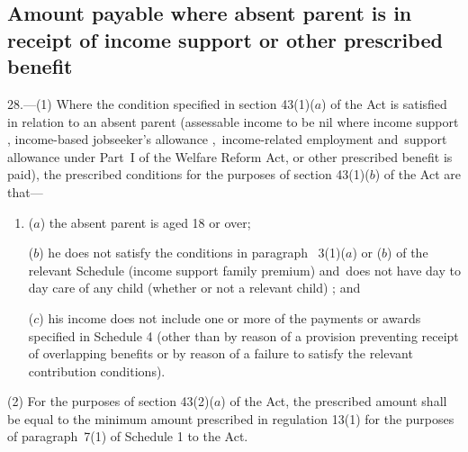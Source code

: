 \documentclass[12pt,a4paper]{article}
\begin{document}

\subsection[28. Amount payable where absent parent is in receipt of income support or other prescribed benefit]{Amount payable where absent parent is in receipt of income support or other prescribed benefit}

28.—(1) Where the condition specified in section 43(1)($a$) of the Act is satisfied in relation to an absent parent (assessable income to be nil where income support%
, income-based jobseeker’s allowance%
,~income-related employment and~support allowance under Part~I of the Welfare Reform Act,  %
or other prescribed benefit is paid), the prescribed conditions for the purposes of section 43(1)($b$) of the Act are that—
\begin{enumerate}\item[]
($a$) the absent parent is aged 18 or over;

($b$) he does not satisfy the conditions in paragraph~
3(1)($a$) or ($b$)  %
of the relevant Schedule (income support family premium)
and~does not have day to day care of any child (whether or not a relevant child)%
; and

($c$) 
his income does not include %
one or more of the payments or awards specified in Schedule 4 (other than by reason of a provision preventing receipt of overlapping benefits or by reason of a failure to satisfy the relevant contribution conditions).
\end{enumerate}

(2) For the purposes of section 43(2)($a$) of the Act, the prescribed amount shall be equal to the minimum amount prescribed in regulation 13(1) for the purposes of paragraph~7(1) of Schedule 1 to the Act.
\end{document}
